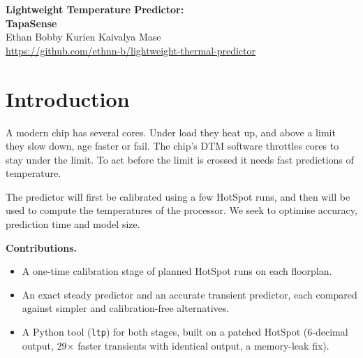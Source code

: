 \documentclass[11pt,a4paper]{article}
\newcommand{\us}{\,$\mu$s}
\begin{document}
\begin{center}
{\LARGE\bfseries Lightweight Temperature Predictor:\\[2pt] TapaSense}\\[8pt]
Ethan Bobby Kurien \quad Kaivalya Mase\\[6pt]
\url{https://github.com/ethnn-b/lightweight-thermal-predictor}
\end{center}

\begin{abstract}
Dynamic thermal management (DTM) needs core temperatures every millisecond, and ideally a few
milliseconds ahead. HotSpot, a thermal simulator, computes them accurately but needs 0.24\,s per steady
answer and 5.5\,ms per 1\,ms transient step. We built a two-stage predictor for heterogeneous
multicore floorplans. A one-time calibration runs HotSpot on each floorplan with 1\,W in one core at a time. The
prediction stage then uses only the stored coefficients. Because HotSpot without leakage is linear, the steady predictor (an influence
matrix) is exact to HotSpot's printed precision ($3\times10^{-5}$\,K worst) at 2.6\us\ per
prediction from under 1\,kB. The transient predictor (a sum of four exponentials) is within
0.06--0.09\,K on average and 0.3\,K worst, at 3\us\ per step from about 4\,kB.
Both results hold on floorplans generated after the models were designed: 500 for the steady
predictor and 100 for the transient one. Skipping calibration accrues an error of 0.8--2.7\,K on
average.
\end{abstract}

\tableofcontents

\section{Introduction}
A modern chip has several cores. Under load they heat up, and above a limit they slow down, age
faster or fail. The chip's DTM software throttles cores to stay under the limit. To act before the
limit is crossed it needs fast predictions of temperature.

The predictor will first be calibrated using a few HotSpot runs, and then will be used to compute
the temperatures of the processor. We seek to optimise accuracy, prediction time and model size.

\textbf{Contributions.}
\begin{itemize}
  \item A one-time calibration stage of planned HotSpot runs on each floorplan.
  \item An exact steady predictor and an accurate transient predictor, each compared against
        simpler and calibration-free alternatives.
  \item A Python tool (\texttt{ltp}) for both stages, built on a patched HotSpot (6-decimal output,
        29$\times$ faster transients with identical output, a memory-leak fix).
\end{itemize}
\end{document}
